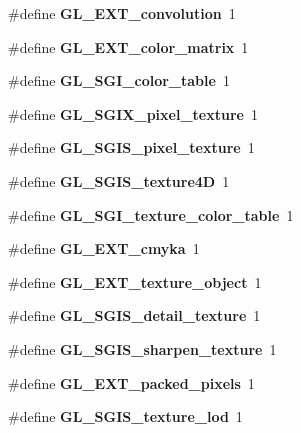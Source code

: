 \begin{DoxyCompactItemize}
\item 
\#define {\bfseries G\+L\+\_\+\+E\+X\+T\+\_\+convolution}~1\label{_s_d_l__opengl_8h_a1538688be378607b694f4a1e23300a37}

\item 
\#define {\bfseries G\+L\+\_\+\+E\+X\+T\+\_\+color\+\_\+matrix}~1\label{_s_d_l__opengl_8h_a54e55b1c36d076bbf42632c357473dba}

\item 
\#define {\bfseries G\+L\+\_\+\+S\+G\+I\+\_\+color\+\_\+table}~1\label{_s_d_l__opengl_8h_a9bc55b2058a4c2e48ce5bd49e0520238}

\item 
\#define {\bfseries G\+L\+\_\+\+S\+G\+I\+X\+\_\+pixel\+\_\+texture}~1\label{_s_d_l__opengl_8h_af9c19bef0b2cdfb1c674bef3cf39736c}

\item 
\#define {\bfseries G\+L\+\_\+\+S\+G\+I\+S\+\_\+pixel\+\_\+texture}~1\label{_s_d_l__opengl_8h_a900d346da0ecda3f2a510b4f28c97f9a}

\item 
\#define {\bfseries G\+L\+\_\+\+S\+G\+I\+S\+\_\+texture4\+D}~1\label{_s_d_l__opengl_8h_af2f871866b351190e144ab3e250a3c32}

\item 
\#define {\bfseries G\+L\+\_\+\+S\+G\+I\+\_\+texture\+\_\+color\+\_\+table}~1\label{_s_d_l__opengl_8h_a7358a87d230afeb8a7417147608ae7d7}

\item 
\#define {\bfseries G\+L\+\_\+\+E\+X\+T\+\_\+cmyka}~1\label{_s_d_l__opengl_8h_a001806ea06c909df692ea03cae36a9c4}

\item 
\#define {\bfseries G\+L\+\_\+\+E\+X\+T\+\_\+texture\+\_\+object}~1\label{_s_d_l__opengl_8h_a0a8f95fb14f4807a9234103764127e1c}

\item 
\#define {\bfseries G\+L\+\_\+\+S\+G\+I\+S\+\_\+detail\+\_\+texture}~1\label{_s_d_l__opengl_8h_a9311509df521f028caabe7dcf70bc1f2}

\item 
\#define {\bfseries G\+L\+\_\+\+S\+G\+I\+S\+\_\+sharpen\+\_\+texture}~1\label{_s_d_l__opengl_8h_ad3226a8bb7dca380d920bdba8206f129}

\item 
\#define {\bfseries G\+L\+\_\+\+E\+X\+T\+\_\+packed\+\_\+pixels}~1\label{_s_d_l__opengl_8h_a37aa82ac7d4e8a36e3975a238e65f121}

\item 
\#define {\bfseries G\+L\+\_\+\+S\+G\+I\+S\+\_\+texture\+\_\+lod}~1\label{_s_d_l__opengl_8h_a0a02ea2d5a3680049831b5be637295f3}


\end{DoxyCompactItemize}
